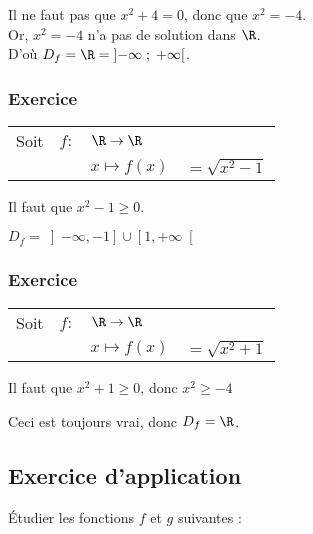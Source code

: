 Il ne faut pas que $x^2 + 4 = 0$, donc que $x^2 = -4 $. \\

Or, $x^2 = -4$ n'a pas de solution dans $\R$. \\

D'où $D_f = \R = \left]-\infty \; ; \; +\infty\right[$.

\subsubsection{Exercice }

\begin{tabular}{llll}

Soit & $f:$& $ \R \rightarrow \R$ & \\
& & $x\mapsto f(x)$ & $=\sqrt{x^2 - 1}$ \\
\end{tabular}

Il faut que $x^2 - 1 \geqslant 0 $.


$D_f = \left]-\infty,-1\right]\cup\left[1,+\infty\right[ $

\subsubsection{Exercice }

\begin{tabular}{llll}

Soit & $f:$& $ \R \rightarrow \R$ & \\
& & $x\mapsto f(x)$ & $=\sqrt{x^2 + 1}$ \\
\end{tabular}

Il faut que $x^2+1 \geqslant 0$, donc $x^2 \geqslant -4$

Ceci est toujours vrai, donc $D_f = \R$.

\newpage

\subsection{Exercice d'application}

Étudier les fonctions $f$ et $g$ suivantes : \\

